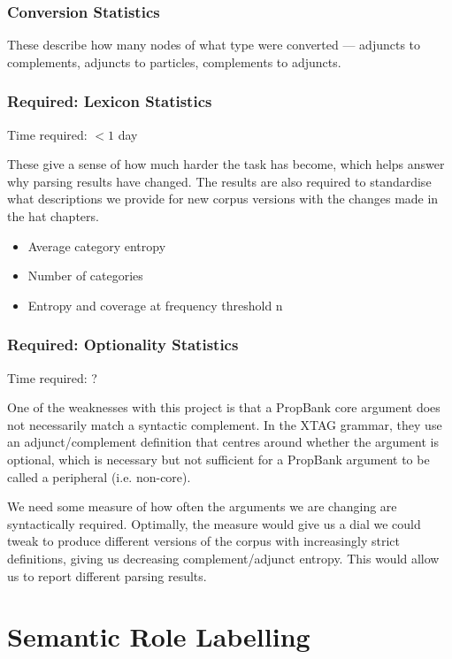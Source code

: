\subsubsection{Conversion Statistics}

These describe how many nodes of what type were converted --- adjuncts to complements, adjuncts to particles, complements to adjuncts.

\subsubsection{Required: Lexicon Statistics}

Time required: $<1$ day

These give a sense of how much harder the task has become, which helps answer why parsing results have changed. The results are also required to standardise what descriptions we provide for new corpus versions with the changes made in the hat chapters.

\begin{itemize}
\item Average category entropy
\item Number of categories
\item Entropy and coverage at frequency threshold n
\end{itemize}

\subsubsection{Required: Optionality Statistics}

Time required: ?

One of the weaknesses with this project is that a PropBank core argument does not necessarily match a syntactic complement. In the XTAG grammar, they use an adjunct/complement definition that centres around whether the argument is optional, which is necessary but not sufficient for a PropBank argument to be called a peripheral (i.e. non-core).

We need some measure of how often the arguments we are changing are syntactically required. Optimally, the measure would give us a dial we could tweak to produce different versions of the corpus with increasingly strict definitions, giving us decreasing complement/adjunct entropy. This would allow us to report different parsing results.

\section{Semantic Role Labelling}

